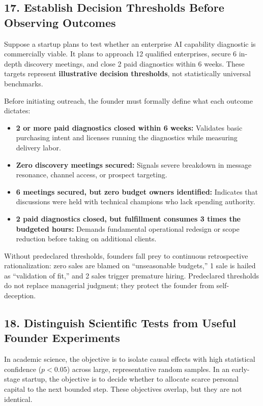\subsection*{17. Establish Decision Thresholds Before Observing Outcomes}

Suppose a startup plans to test whether an enterprise AI capability diagnostic is commercially viable. It plans to approach 12 qualified enterprises, secure 6 in-depth discovery meetings, and close 2 paid diagnostics within 6 weeks. These targets represent \textbf{illustrative decision thresholds}, not statistically universal benchmarks.

Before initiating outreach, the founder must formally define what each outcome dictates:
\begin{itemize}
    \item \textbf{2 or more paid diagnostics closed within 6 weeks:} Validates basic purchasing intent and licenses running the diagnostics while measuring delivery labor.
    \item \textbf{Zero discovery meetings secured:} Signals severe breakdown in message resonance, channel access, or prospect targeting.
    \item \textbf{6 meetings secured, but zero budget owners identified:} Indicates that discussions were held with technical champions who lack spending authority.
    \item \textbf{2 paid diagnostics closed, but fulfillment consumes 3 times the budgeted hours:} Demands fundamental operational redesign or scope reduction before taking on additional clients.
\end{itemize}

Without predeclared thresholds, founders fall prey to continuous retrospective rationalization: zero sales are blamed on ``unseasonable budgets,'' 1 sale is hailed as ``validation of fit,'' and 2 sales trigger premature hiring. Predeclared thresholds do not replace managerial judgment; they protect the founder from self-deception.

\subsection*{18. Distinguish Scientific Tests from Useful Founder Experiments}

In academic science, the objective is to isolate causal effects with high statistical confidence ($p < 0.05$) across large, representative random samples. In an early-stage startup, the objective is to decide whether to allocate scarce personal capital to the next bounded step. These objectives overlap, but they are not identical.


